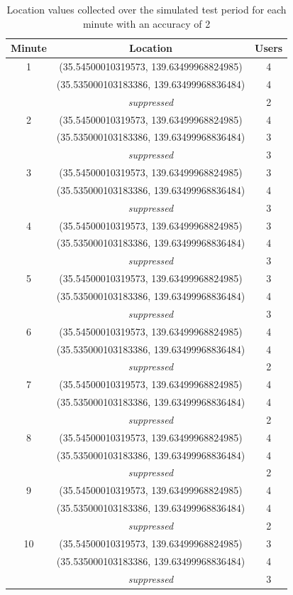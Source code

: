 \begin{table}[htbp]
	\centering
	\begin{tabular}{|c c c|} 
		\hline
		Minute & Location & Users\\ [0.5ex] 
		\hline\hline
		1 & (35.54500010319573, 139.63499968824985) & 4 \\ 
		& (35.535000103183386, 139.63499968836484) & 4 \\ 
		&\textit{suppressed}& 2 \\ 
		\hline
		2 & (35.54500010319573, 139.63499968824985) & 4 \\ 
		& (35.535000103183386, 139.63499968836484) & 3 \\ 
		&\textit{suppressed}& 3 \\ 
		\hline
		3 & (35.54500010319573, 139.63499968824985) & 3 \\ 
		& (35.535000103183386, 139.63499968836484) & 4 \\ 
		&\textit{suppressed}& 3 \\ 
		\hline
		4 & (35.54500010319573, 139.63499968824985) & 3 \\ 
		& (35.535000103183386, 139.63499968836484) & 4 \\ 
		&\textit{suppressed}& 3 \\ 
		\hline
		5 & (35.54500010319573, 139.63499968824985) & 3 \\ 
		& (35.535000103183386, 139.63499968836484) & 4 \\ 
		&\textit{suppressed}& 3 \\ 
		\hline
		6 & (35.54500010319573, 139.63499968824985) & 4 \\ 
		& (35.535000103183386, 139.63499968836484) & 4 \\ 
		&\textit{suppressed}& 2 \\ 
		\hline
		7 & (35.54500010319573, 139.63499968824985) & 4 \\ 
		& (35.535000103183386, 139.63499968836484) & 4 \\ 
		&\textit{suppressed}& 2 \\ 
		\hline
		8 & (35.54500010319573, 139.63499968824985) & 4 \\ 
		& (35.535000103183386, 139.63499968836484) & 4 \\ 
		&\textit{suppressed}& 2 \\  
		\hline
		9 & (35.54500010319573, 139.63499968824985) & 4 \\ 
		& (35.535000103183386, 139.63499968836484) & 4 \\ 
		&\textit{suppressed}& 2 \\ 
		\hline
		10 & (35.54500010319573, 139.63499968824985) & 3 \\ 
		& (35.535000103183386, 139.63499968836484) & 4 \\ 
		&\textit{suppressed}& 3 \\ 
		\hline
	\end{tabular}
	\caption{Location values collected over the simulated test period for each minute with an accuracy of 2}
	\label{tab:location_sim2}
\end{table}


